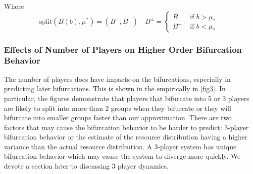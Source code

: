 \documentclass{article}
\begin{document}
            Where 
            \begin{equation}
               \text{split}(B(b),\mu^*)= (B^+,B^-) \quad B^\pm =\begin{cases}
                    B^+ & \text{ if } b>\mu_*\\
                    B^- & \text{ if } b<\mu_*
                \end{cases}  
            \end{equation}
    
    
                
            \subsubsection{Effects of Number of Players on Higher Order Bifurcation Behavior}
                The number of players does have impacts on the bifurcations, especially in predicting later bifurcations. This is shown in the empirically in \cref{fig3}. In particular, the figures demonstrate that players that bifurcate into 5 or 3 players are likely to split into more than 2 groups when they bifurcate or they will bifurcate into smaller groups faster than our approximation. There are two factors that may cause the bifurcation behavior to be harder to predict: 3-player bifurcation behavior or the estimate of the resource distribution having a higher variance than the actual resource distribution. A 3-player system has unique bifurcation behavior which may cause the system to diverge more quickly. We devote a section later to discussing 3 player dynamics.
\end{document}
